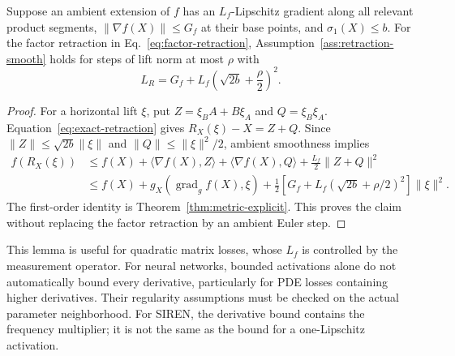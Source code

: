 \begin{lemma}
\label{lem:ambient-smoothness}
Suppose an ambient extension of $f$ has an $L_f$-Lipschitz gradient along
all relevant product segments, $\|\nabla f(X)\|\leq G_f$ at their base
points, and $\sigma_1(X)\leq b$. For the factor retraction in
Eq.~\eqref{eq:factor-retraction}, Assumption~\ref{ass:retraction-smooth}
holds for steps of lift norm at most $\rho$ with
\begin{equation}
 L_R=G_f+L_f\left(\sqrt{2b}+\frac\rho2\right)^2.
 \label{eq:explicit-smoothness}
\end{equation}
\end{lemma}
\begin{proof}
For a horizontal lift $\xi$, put $Z=\xi_BA+B\xi_A$ and
$Q=\xi_B\xi_A$. Equation~\eqref{eq:exact-retraction} gives
$R_X(\xi)-X=Z+Q$. Since
$\|Z\|\leq\sqrt{2b}\|\xi\|$ and $\|Q\|\leq\|\xi\|^2/2$,
ambient smoothness implies
\begin{align}
 f(R_X(\xi))&\leq f(X)+\langle\nabla f(X),Z\rangle
       +\langle\nabla f(X),Q\rangle+\tfrac{L_f}{2}\|Z+Q\|^2\\
 &\leq f(X)+g_X(\operatorname{grad}_g f(X),\xi)
       +\tfrac12\left[G_f+L_f(\sqrt{2b}+\rho/2)^2\right]\|\xi\|^2.
\end{align}
The first-order identity is Theorem~\ref{thm:metric-explicit}. This proves
the claim without replacing the factor retraction by an ambient Euler step.
\end{proof}

This lemma is useful for quadratic matrix losses, whose $L_f$ is controlled
by the measurement operator. For neural networks, bounded activations alone
do not automatically bound every derivative, particularly for PDE losses
containing higher derivatives. Their regularity assumptions must be checked
on the actual parameter neighborhood. For SIREN, the derivative bound
contains the frequency multiplier; it is not the same as the bound for
a one-Lipschitz activation.

